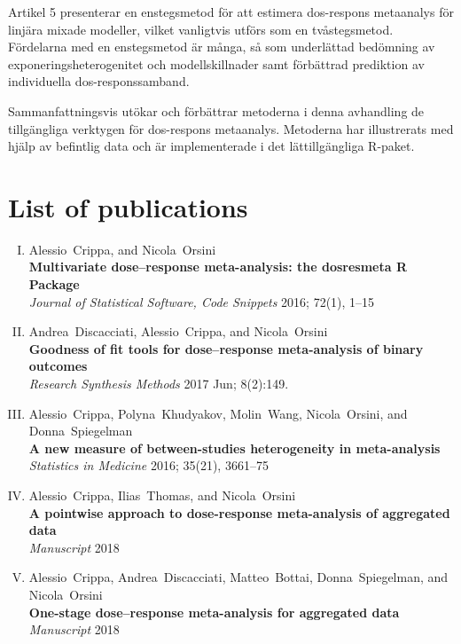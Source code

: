 \documentclass[11pt,a4paper,twoside,openany]{book}\usepackage{knitr}
\makeatletter
\def\cleardoublepage{\clearpage\if@twoside
\ifodd\c@page
\else\hbox{}\thispagestyle{empty}\newpage
\if@twocolumn\hbox{}\newpage\fi\fi\fi}
\makeatother
\begin{document}
{{Artikel 5 presenterar en enstegsmetod för att estimera dos-respons metaanalys för linjära mixade modeller, vilket vanligtvis utförs som en tvåstegsmetod. Fördelarna med en enstegsmetod är många, så som underlättad bedömning av exponeringsheterogenitet och modellskillnader samt förbättrad prediktion av individuella dos-responssamband. 

Sammanfattningsvis utökar och förbättrar metoderna i denna avhandling de tillgängliga verktygen för dos-respons metaanalys. Metoderna har illustrerats med hjälp av befintlig data och är implementerade i det lättillgängliga R-paket.


\normalsize
\cleardoublepage

%

\chapter*{List of publications}

\begin{enumerate}[I.]
\item Alessio~Crippa, and Nicola~Orsini \\ \textbf{Multivariate dose--response meta-analysis: the dosresmeta R Package} \\ \textit{Journal of Statistical Software, Code Snippets} 2016; 72(1), 1--15
\item Andrea~Discacciati, Alessio~Crippa, and Nicola~Orsini \\ \textbf{Goodness of fit tools for dose--response meta-analysis of binary outcomes} \\ \textit{Research Synthesis Methods} 2017 Jun; 8(2):149.
\item Alessio~Crippa, Polyna~Khudyakov, Molin~Wang, Nicola~Orsini, and Donna~Spiegelman \\ \textbf{A new measure of between-studies heterogeneity in meta-analysis} \\ \textit{Statistics in Medicine} 2016; 35(21), 3661--75
\item Alessio~Crippa, Ilias~Thomas, and Nicola~Orsini \\ \textbf{A pointwise approach to dose-response meta-analysis of aggregated data} \\ \textit{Manuscript} 2018
\item Alessio~Crippa, Andrea~Discacciati, Matteo~Bottai, Donna~Spiegelman, and Nicola~Orsini \\ \textbf{One-stage dose--response meta-analysis for aggregated data} \\ \textit{Manuscript} 2018
\end{enumerate}
\vspace{1.5cm}

}}
\end{document}
